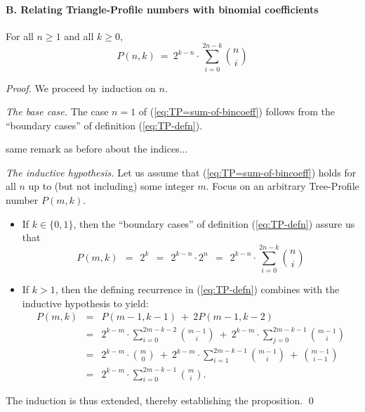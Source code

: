 \paragraph{\small\sf B. Relating Triangle-Profile numbers with binomial coefficients}

\begin{prop}
\label{thm:TP=sum-of-bincoeff}
For all $n \geq 1$ and all $k \geq 0$,
\begin{equation}
\label{eq:TP=sum-of-bincoeff}
P(n,k) \ = \ 2^{k-n} \cdot \sum_{i=0}^{2n-k} {n \choose i}
\end{equation}
\end{prop}

\begin{proof}
We proceed by induction on $n$.

\medskip

\noindent
{\it The base case.}
The case $n=1$ of (\ref{eq:TP=sum-of-bincoeff}) follows from the
``boundary cases'' of definition (\ref{eq:TP-defn}).

\medskip

{\Denis same remark as before about the indices...}

\noindent
{\it The inductive hypothesis.}
Let us assume that (\ref{eq:TP=sum-of-bincoeff}) holds for all $n$ up
to (but not including) some integer $m$.  Focus on an arbitrary
Tree-Profile number $P(m,k)$.
\begin{itemize}
\item
If $k \in \{0,1\}$, then the ``boundary cases'' of definition
(\ref{eq:TP-defn}) assure us that
\[
P(m,k) \ \ = \ \ 2^k \ \ = \ \ 2^{k-n} \cdot 2^n \ \ = \ \ 
2^{k-n} \cdot \sum_{i=0}^{2n-k} {n \choose i}
\]

\item
If $k > 1$, then the defining recurrence in (\ref{eq:TP-defn})
combines with the inductive hypothesis to yield:
\begin{eqnarray*}
\nonumber
P(m, k) & = &
   P(m-1, k-1) \ + \ 2 P(m-1, k-2) \\
        & = &
   2^{k-m} \cdot \sum_{i=0}^{2m-k-2} {m-1 \choose i}
   \ + \
   2^{k-m} \cdot \sum_{j=0}^{2m-k-1} {m-1 \choose i} \\
        & = &
   2^{k-m} \cdot {m \choose 0}
   \ + \
   2^{k-m} \cdot \sum_{i=1}^{2m-k-1} {m-1 \choose i}
   \ + \
   {{m-1} \choose {i-1}} \\
        & = &
   2^{k-m} \cdot \sum_{i=0}^{2m-k-1} {m \choose i}.
\end{eqnarray*}
\end{itemize}
The induction is thus extended, thereby establishing the proposition.
\qed
\end{proof}

